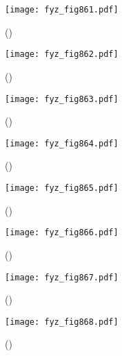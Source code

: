     \begin{figure}[ht!] %
      \centering
      \texttt{[image: fyz\_fig861.pdf]}
      \caption{
               (\cite[s.~707]{Feynman02})}
      \label{fyz:fig861}
    \end{figure}

    \begin{figure}[ht!] %
      \centering
      \texttt{[image: fyz\_fig862.pdf]}
      \caption{
               (\cite[s.~707]{Feynman02})}
      \label{fyz:fig862}
    \end{figure}

    \begin{figure}[ht!] %
      \centering
      \texttt{[image: fyz\_fig863.pdf]}
      \caption{
               (\cite[s.~707]{Feynman02})}
      \label{fyz:fig863}
    \end{figure}

    \begin{figure}[ht!] %
      \centering
      \texttt{[image: fyz\_fig864.pdf]}
      \caption{
               (\cite[s.~707]{Feynman02})}
      \label{fyz:fig864}
    \end{figure}

    \begin{figure}[ht!] %
      \centering
      \texttt{[image: fyz\_fig865.pdf]}
      \caption{
               (\cite[s.~707]{Feynman02})}
      \label{fyz:fig865}
    \end{figure}

    \begin{figure}[ht!] %
      \centering
      \texttt{[image: fyz\_fig866.pdf]}
      \caption{
               (\cite[s.~707]{Feynman02})}
      \label{fyz:fig866}
    \end{figure}

    \begin{figure}[ht!] %
      \centering
      \texttt{[image: fyz\_fig867.pdf]}
      \caption{
               (\cite[s.~707]{Feynman02})}
      \label{fyz:fig867}
    \end{figure}

    \begin{figure}[ht!] %
      \centering
      \texttt{[image: fyz\_fig868.pdf]}
      \caption{
               (\cite[s.~707]{Feynman02})}
      \label{fyz:fig868}
    \end{figure}

